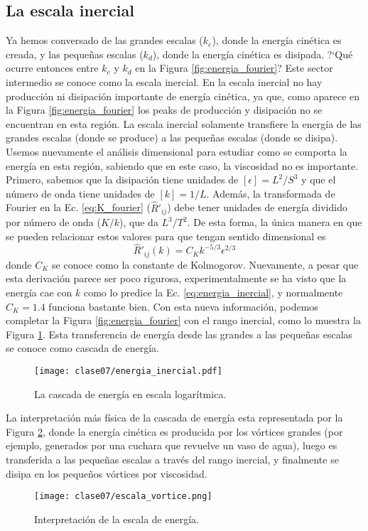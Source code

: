 \subsection*{La escala inercial}
Ya hemos conversado de las grandes escalas ($k_e$), donde la energía cinética es creada, y las pequeñas escalas ($k_d$), donde la energía cinética es disipada.
\mbox{?`}Qué ocurre entonces entre $k_e$ y $k_d$ en la Figura \ref{fig:energia_fourier}?
Este sector intermedio se conoce como la escala inercial. 
En la escala inercial no hay producción ni disipación importante de energía cinética, ya que, como aparece en la Figura \ref{fig:energia_fourier} los peaks de producción y disipación no se encuentran en esta región.
La escala inercial solamente transfiere la energía de las grandes escalas (donde se produce) a las pequeñas escalas (donde se disipa).
Usemos nuevamente el análisis dimensional para estudiar como se comporta la energía en esta región, sabiendo que en este caso, la viscosidad no es importante.
Primero, sabemos que la disipación tiene unidades de $[\epsilon] = L^2/S^3$ y que el número de onda tiene unidades de $[k] = 1/L$.
Además, la transformada de Fourier en la Ec. \eqref{eq:K_fourier} ($\hat{R}'_{ij}$) debe tener unidades de energía dividido por número de onda ($K/k$), que da $L^3/T^2$.
De esta forma, la única manera en que se pueden relacionar estos valores para que tengan sentido dimensional es
%
\begin{equation}\label{eq:energia_inercial}
\hat{R}'_{ij}(k) = C_K k^{-5/3}\epsilon^{2/3}
\end{equation}
%
donde $C_K$ se conoce como la constante de Kolmogorov.
Nuevamente, a pesar que esta derivación parece ser poco rigurosa, experimentalmente se ha visto que la energía cae con $k$ como lo predice la Ec. \eqref{eq:energia_inercial}, y normalmente $C_K=1.4$ funciona bastante bien.
Con esta nueva información, podemos completar la Figura \ref{fig:energia_fourier} con el rango inercial, como lo muestra la Figura \ref{fig:energia_inercial}.
Esta transferencia de energía desde las grandes a las pequeñas escalas se conoce como cascada de energía. 
%
\begin{figure}[h!]
\centering
\texttt{[image: clase07/energia\_inercial.pdf]}
\caption{La cascada de energía en escala logarítmica.}
\label{fig:energia_inercial}
\end{figure}

La interpretación más física de la cascada de energía esta representada por la Figura \ref{fig:escala_vortice}, donde la energía cinética es producida por los vórtices grandes (por ejemplo, generados por una cuchara que revuelve un vaso de agua), luego es transferida a las pequeñas escalas a través del rango inercial, y finalmente se disipa en los pequeños vórtices por viscosidad.
%
\begin{figure}[h!]
\centering
\texttt{[image: clase07/escala\_vortice.png]}
\caption{Interpretación de la escala de energía.}
\label{fig:escala_vortice}
\end{figure}

